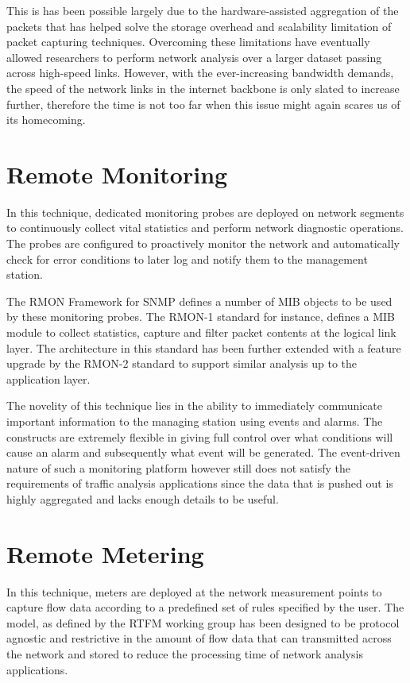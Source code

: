 This is has been possible largely due to the hardware-assisted aggregation of the packets that has helped solve the storage overhead and scalability limitation of packet capturing techniques. Overcoming these limitations have eventually allowed researchers to perform network analysis over a  larger dataset passing across high-speed links. However, with the ever-increasing bandwidth demands, the speed of the network links in the internet backbone is only slated to increase further, therefore the time is not too far when this issue might again scares us of its homecoming. 

\section{Remote Monitoring}\label{sec:remote-monitoring}
In this technique, dedicated monitoring probes are deployed on network segments to continuously collect vital statistics and perform network diagnostic operations. The probes are configured to proactively monitor the network and automatically check for error conditions to later log and notify them to the management station. 

The \ac{RMON} Framework \cite{rfc3577} for \ac{SNMP} \cite{rfc1157} defines a number of \ac{MIB} objects to be used by these monitoring probes. The \ac{RMON}-1 standard \cite{rfc2819} for instance, defines a \ac{MIB}  module to collect statistics, capture and filter packet contents at the logical link layer. The architecture in this standard has been further extended with a feature upgrade by the \ac{RMON}-2 standard \cite{rfc4502} to support similar analysis up to the application layer.

The novelity of this technique lies in the ability to immediately communicate important information to the managing station using events and alarms. The constructs are extremely flexible in giving full control over what conditions will cause an alarm  and subsequently what event will be generated. The event-driven nature of such a monitoring platform however still does not satisfy the requirements of traffic analysis applications since the data that is pushed out is highly aggregated and lacks enough details to be useful. 

\section{Remote Metering}\label{sec:remote-metering}
In this technique, meters are deployed at the network measurement points to capture flow data according to a predefined set of rules specified by the user. The model, as defined by the \ac{RTFM} working group \cite{rfc2722} has been designed to be protocol agnostic and restrictive in the amount of flow data that can transmitted across the network and stored to reduce the processing time of network analysis applications. 

